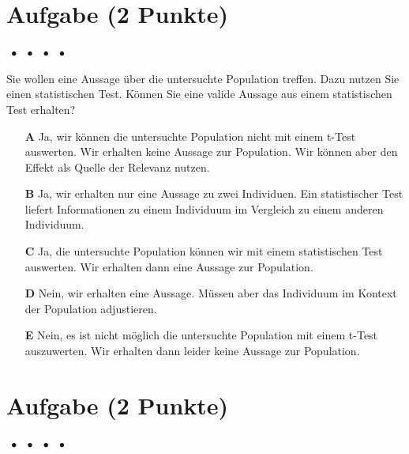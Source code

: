 \documentclass[a4paper, 9pt]{scrartcl}\usepackage[]{graphicx}\usepackage[]{xcolor}
\begin{document}
\section{Aufgabe \hfill (2 Punkte)}

\ifcollection
\begin{flushright}
\tiny\vspace{-2Ex}
\textbf{\examinhaltstart}
\exammodulemathstat $\;\bullet$
\exammodulestat $\;\bullet$
\exammodulestatbbv $\;\bullet$
\exammodulestatversuch $\;\bullet$
\exammodulebiostat
\vspace{-1Ex}
\end{flushright}
\fi




Sie wollen eine Aussage über die untersuchte Population treffen. Dazu nutzen Sie einen statistischen Test. Können Sie eine valide Aussage aus einem statistischen Test erhalten?



\begin{enumerate}
\item [\textbf{A} \msquare] Ja, wir können die untersuchte Population nicht mit einem t-Test auswerten. Wir erhalten keine Aussage zur Population. Wir können aber den Effekt als Quelle der Relevanz nutzen.
\item [\textbf{B} \msquare] Ja, wir erhalten nur eine Aussage zu zwei Individuen. Ein statistischer Test liefert Informationen zu einem Individuum im Vergleich zu einem anderen Individuum.
\item [\textbf{C} \msquare] Ja, die untersuchte Population können wir mit einem statistischen Test auswerten. Wir erhalten dann eine Aussage zur Population.
\item [\textbf{D} \msquare] Nein, wir erhalten eine Aussage. Müssen aber das Individuum im Kontext der Population adjustieren.
\item [\textbf{E} \msquare] Nein, es ist nicht möglich die untersuchte Population mit einem t-Test auszuwerten. Wir erhalten dann leider keine Aussage zur Population.
\end{enumerate}

\section{Aufgabe \hfill (2 Punkte)}

\ifcollection
\begin{flushright}
\tiny\vspace{-2Ex}
\textbf{\examinhaltstart}
\exammodulemathstat $\;\bullet$
\exammodulestat $\;\bullet$
\exammodulestatbbv $\;\bullet$
\exammodulestatversuch $\;\bullet$
\exammodulebiostat
\vspace{-1Ex}
\end{flushright}
\fi
\end{document}
